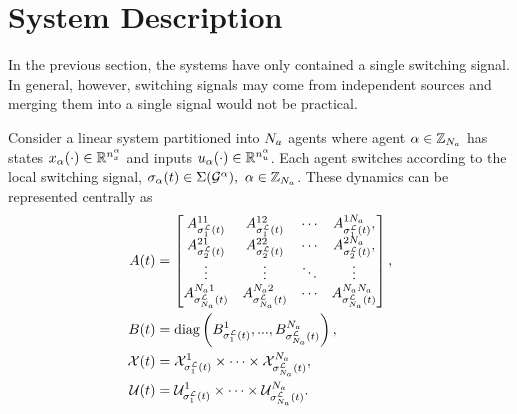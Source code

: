 
\section{System Description}
In the previous section, the systems have only contained a single switching signal. In general, however, switching signals may come from independent sources and merging them into a single signal would not be practical. 

Consider a linear system partitioned into ${N_a}$ agents where agent $\alpha\in\mathbb{Z}_{{N_a}}$ has states $x_{\alpha}(\cdot)\in\mathbb{R}^{n_x^\alpha}$ and inputs $u_{\alpha}(\cdot)\in\mathbb{R}^{n_u^\alpha}$. Each agent switches according to the local switching signal, $\ss_\agentidx(t)\in\Sigma(\graph^\agentidx),\ \agentidx\in\idxset{\numagents}$. These dynamics can be represented centrally as
\begin{subequations}
\label{eq:sys}
\begin{align}
A(t)&=\begin{bmatrix}
A^{11}_{\ssl[1](t)}&A^{12}_{\ssl[1](t)}&\cdots&A^{1\numagents}_{\ssl[1](t)},\\
A^{21}_{\ssl[2](t)}&A^{22}_{\ssl[2](t)}&\cdots&A^{2\numagents}_{\ssl[2](t)},\\
\vdots&\vdots & \ddots & \vdots\\
A^{\numagents 1}_{\ssl[\numagents](t)} & A^{\numagents 2}_{\ssl[\numagents](t)} &\cdots & A^{\numagents \numagents}_{\ssl[\numagents](t)} 
\end{bmatrix},\label{eq:sys_A}\\
B(t)&=\text{diag}\left(
B^{1}_{\ssl[1](t)},...,B^{\numagents}_{\ssl[\numagents](t)}\right),\label{eq:sys_B}\\
\xcon(t)&=\xcon[\ssl[1](t)]^1\times\cdots\times\xcon[\ssl[\numagents](t)]^\numagents,\label{eq:sys_X}\\
\ucon(t)&=\ucon[\ssl[1](t)]^1\times\cdots\times\ucon[\ssl[\numagents](t)]^\numagents\label{eq:sys_Y}.
\end{align}
\end{subequations}
